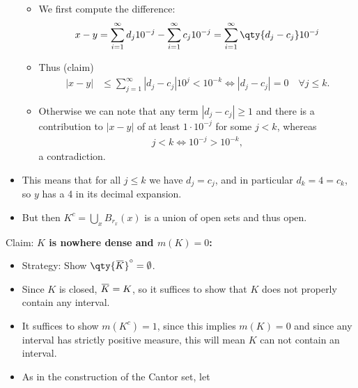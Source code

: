 \begin{solution}
\begin{itemize}
  \begin{itemize}
  \tightlist
  \item
    We first compute the difference:
    \begin{align*}  
    x - y &= \sum_{i=1}^\infty d_j 10^{-j} - \sum_{i=1}^\infty c_j 10^{-j} = \sum_{i=1}^\infty \qty{d_j - c_j} 10^{-j} \\
    \end{align*}
  \item
    Thus (claim)
    \begin{align*}
    {\left\lvert {x-y} \right\rvert} &\leq \sum_{j=1}^\infty {\left\lvert {d_j - c_j} \right\rvert} 10^j < 10^{-k} \iff {\left\lvert {d_j - c_j} \right\rvert} = 0 \quad \forall j\leq k
    .\end{align*}
  \item
    Otherwise we can note that any term
    \({\left\lvert {d_j - c_j} \right\rvert}\geq 1\) and there is a
    contribution to \({\left\lvert {x-y} \right\rvert}\) of at least
    \(1\cdot 10^{-j}\) for some \(j < k\), whereas
    \begin{align*}  
    j < k \iff 10^{-j} > 10^{-k}
    ,\end{align*}
    a contradiction.
  \end{itemize}
\item
  This means that for all \(j \leq k\) we have \(d_j = c_j\), and in
  particular \(d_k = 4 = c_k\), so \(y\) has a 4 in its decimal
  expansion.
\item
  But then \(K^c = \displaystyle\bigcup_x B_{r_x}(x)\) is a union of
  open sets and thus open.
\end{itemize}

Claim: \textbf{\(K\) is nowhere dense and \(m(K) = 0\):}

\begin{itemize}
\item
  Strategy: Show
  \(\qty{\mkern 1.5mu\overline{\mkern-1.5muK\mkern-1.5mu}\mkern 1.5mu}^\circ = \emptyset\).
\item
  Since \(K\) is closed,
  \(\mkern 1.5mu\overline{\mkern-1.5muK\mkern-1.5mu}\mkern 1.5mu = K\),
  so it suffices to show that \(K\) does not properly contain any
  interval.
\item
  It suffices to show \(m(K^c) = 1\), since this implies \(m(K) = 0\)
  and since any interval has strictly positive measure, this will mean
  \(K\) can not contain an interval.
\item
  As in the construction of the Cantor set, let


\end{itemize}
\end{solution}

